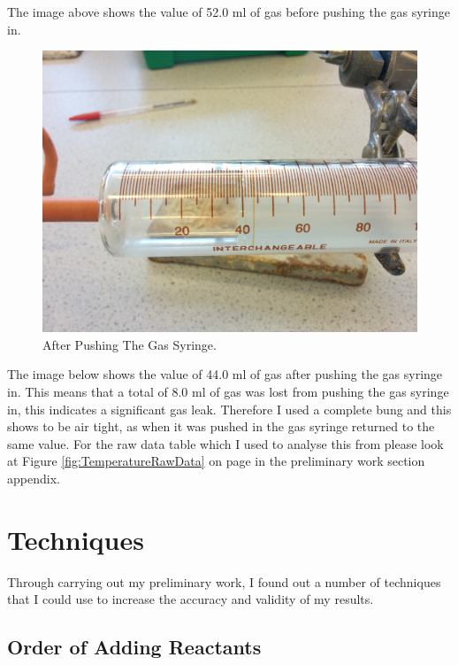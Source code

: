 The image above shows the value of 52.0 ml of gas before pushing the gas syringe in.

\begin{figure}[H]
    \includegraphics[width=\textwidth]{./preliminarywork/images/AfterPush.jpg}
    \caption{After Pushing The Gas Syringe.} \label{fig:AfterPush}
\end{figure}

The image below shows the value of 44.0 ml of gas after pushing the gas syringe in. This means that a total of 8.0 ml of gas was lost from pushing the gas syringe in, this indicates a significant gas leak. Therefore I used a complete bung and this shows to be air tight, as when it was pushed in the gas syringe returned to the same value. For the raw data table which I used to analyse this from please look at Figure \ref{fig:TemperatureRawData} on page \pageref{fig:TemperatureRawData} in the preliminary work section appendix.



\section {Techniques}

Through carrying out my preliminary work, I found out a number of techniques that I could use to increase the accuracy and validity of my results.

	\subsection{Order of Adding Reactants}

